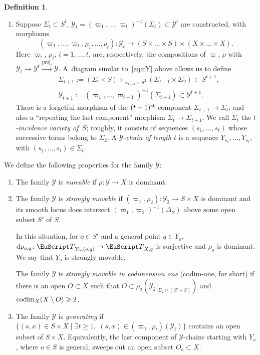\documentclass[10pt,a4paper]{article}
\numberwithin{equation}{section}
\theoremstyle{definition}
\newtheorem{m-definition}[m-theorem]{Definition}
\theoremstyle{remark}
\let\euf\EuScript %
\let\cal\mathcal
\let\ges\geqslant
\let\sm\setminus
\let\Si\Sigma
\let\vpi\varpi
\newcommand{\codim}{\mathop{\rm codim}\nolimits}
\newcommand{\rd}{{\rm d}}
\newcommand{\eT}{{\euf T}}
\newcommand{\cY}{{\cal Y}}
\newcommand{\XX}{X}
\newcommand{\YY}{Y}
\newcommand{\proj}{\mathrm{proj}}
\newcommand{\lra}{\longrightarrow}
\begin{document}
\begin{m-definition}
\begin{aenum}
\begin{enumerate}
\item\label{d:YY-g-a3} Suppose $\Si_t\subset S^t$, $\cY_t=(\vpi_1,\dots,\vpi_t)^{-1}(\Si_t)\subset\cY^t$ are constructed, with morphisms 
\[
(\vpi_1,\dots,\vpi_t,\rho_1,\dots,\rho_t)\colon \cY_t\lra (S\times\dots\times S)\times (\XX\times\dots\times \XX).
\]
Here $\vpi_i$, $\rho_i$, $i=1,\dots, t$, are, respectively, the compositions of $\vpi$, $\rho$ with $\cY_t\to\cY^t\xrightarrow{\proj_i}\cY$. A~diagram similar to~\eqref{eq:cY} above allows us to define 
\begin{align*}
&\Si_{t+1}:=(\Sigma_t\times S)\times_{\Sigma_{t-1} \times S^{2}}\left(\Sigma_{t-1}\times\Sigma_2\right)\subset S^{t+1}, 
\\
&\cY_{t+1}:=\left(\vpi_1,\dots,\vpi_{t+1}\right)^{-1}\left(\Si_{t+1}\right)\subset\cY^{t+1}.
\end{align*}
There is a forgetful morphism of the $(t+1)^{\rm st}$ component $\Sigma_{t+1}\to\Sigma_{t}$, and also a ``repeating the last component'' morphism $\Sigma_t\to\Sigma_{t+1}$. We call $\Si_t$ the \emph{$t$-incidence variety of\, $S$}; roughly, it consists of sequences $(s_1,\dots,s_t)$ whose successive terms belong to $\Sigma_2$. A \emph{$\cY$-chain of length $t$} is a sequence $\YY_{s_1},\dots,\YY_{s_t}$, with $(s_1,\dots,s_t)\in\Si_t$. 
\end{enumerate}

\item \label{d:YY-g-b}
We define the following properties for the family $\cY$: 
\begin{enumerate}
\item\label{d:YY-g-b1} The family $\cY$ is \emph{movable} if $\rho\colon\cY\to \XX$ is dominant. 

\item\label{d:YY-g-b2} The family $\cY$ is \emph{strongly movable} if $(\vpi_1,\rho_2)\colon\cY_2\to S\times \XX$ is dominant and its smooth locus does intersect $(\varpi_1,\varpi_2)^{-1}(\Delta_S)$ above some open subset $S'$ of $S$. 

  In this situation, for $o\in S'$ and a general point $q\in\YY_o$, $\rd\rho_{o,q}\colon\eT_{\cY_o,(o,q)}\to\eT_{\XX,q}$ is surjective and $\rho_o$ is dominant. We say that $\YY_o$ is strongly movable. 

The family $\cY$ is \emph{strongly movable in codimension one} (codim-one, for short) if there is an open $O\subset\XX$  such that  
$O\subset\rho_2(\cY_2|_{\Sigma_2\cap (S'\times S)})$ and $\codim_\XX(\XX\sm O)\ges2$. 

\item\label{d:YY-g-b3} The family $\cY$ is \emph{generating} if $\big\{(s,x)\in S\times\XX\mid \exists t\ges 1,\;(s,x)\in(\vpi_1,\rho_t)(\cY_t)\big\}$ contains an open subset of $S\times\XX$. Equivalently, the last component of $\cY$-chains starting with $Y_o$, where $o\in S$ is general, sweeps out an open subset $O_o\subset\XX$.


\end{enumerate}
\end{aenum}
\end{m-definition}
\end{document}
